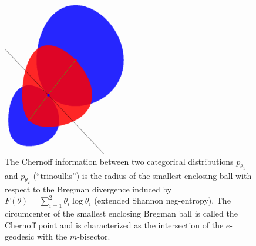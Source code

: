 \documentclass[11pt]{article}
\begin{document}
\begin{figure}
\centering
\includegraphics[width=0.5\textwidth]{ChernoffEKL-1.png}

\caption{The Chernoff information between two categorical distributions $p_{\theta_1}$ and $p_{\theta_2}$ (``trinoullis'') is the radius of the smallest enclosing ball with respect to the Bregman divergence induced by  $F(\theta)=\sum_{i=1}^2 \theta_i\log\theta_i$ (extended Shannon neg-entropy).
The circumcenter of the smallest enclosing Bregman ball is called the Chernoff point and is characterized as the intersection of the $e$-geodesic with the $m$-bisector.
 }\label{figChernoffEKL-1.png:}
\end{figure} 

\end{document}
